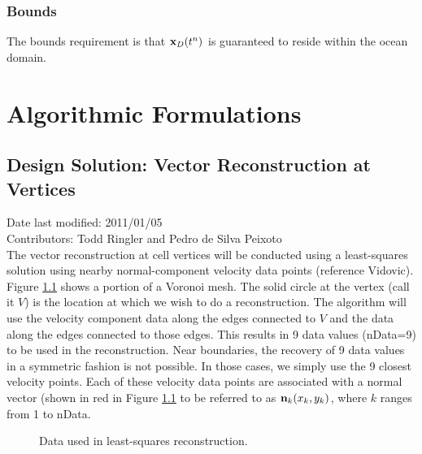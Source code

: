 \documentclass[11pt]{report}
\begin{document}
\subsection{Bounds}
The bounds requirement is that ${\bf x}_D(t^n)$ is guaranteed to reside within the ocean domain.




\chapter{Algorithmic Formulations}

\section{Design Solution: Vector Reconstruction at Vertices}
Date last modified: 2011/01/05 \\
Contributors: Todd Ringler and Pedro de Silva Peixoto \\

The vector reconstruction at cell vertices will be conducted using a least-squares solution using nearby normal-component velocity data points (reference Vidovic). Figure \ref{fig:least_squares} shows a portion of a Voronoi mesh. The solid circle at the vertex (call it $V$) is the location at which we wish to do a reconstruction. The algorithm will use the velocity component data along the edges connected to $V$ and the data along the edges connected to those edges. This results in 9 data values (nData=9) to be used in the reconstruction. Near boundaries, the recovery of 9 data values in a symmetric fashion is not possible. In those cases, we simply use the 9 closest velocity points. Each of these velocity data points are associated with a normal vector (shown in red in Figure \ref{fig:least_squares} to be referred to as ${\bf n}_k(x_k,y_k)$, where $k$ ranges from 1 to nData.

\begin{figure}
  \caption{Data used in least-squares reconstruction.}
  \label{fig:least_squares}
\end{figure} 
\end{document}

